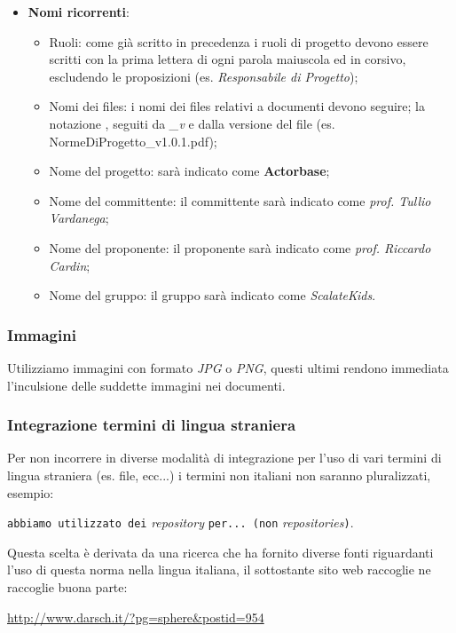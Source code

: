 \documentclass{scalatekids-article}
\begin{document}
\begin{itemize}
\item \textbf{Nomi ricorrenti}:
  \begin{itemize}
  \item Ruoli: come già scritto in precedenza i ruoli di progetto devono essere scritti con la prima lettera di ogni parola maiuscola ed in corsivo, escludendo le proposizioni (es. \textit{Responsabile di Progetto});
  \item Nomi dei files: i nomi dei files relativi a documenti devono seguire;
    la notazione \textit{}, seguiti da \textit{\_v} e dalla
    versione del file (es. NormeDiProgetto\_v1.0.1.pdf);
  \item Nome del progetto: sarà indicato come \textbf{Actorbase};
  \item Nome del committente: il committente sarà indicato come \textit{prof. Tullio Vardanega};
  \item Nome del proponente: il proponente sarà indicato come \textit{prof. Riccardo Cardin};
  \item Nome del gruppo: il gruppo sarà indicato come \textit{ScalateKids}.
  \end{itemize}
\end{itemize}

\subsubsection{Immagini}
Utilizziamo immagini con formato \textit{JPG} o \textit{PNG}, questi ultimi rendono immediata l'inculsione delle suddette immagini nei documenti.

\subsubsection{Integrazione termini di lingua straniera}
Per non incorrere in diverse modalità di integrazione per l'uso di vari termini di lingua straniera (es. file,  ecc...) i termini non italiani non saranno pluralizzati, esempio:\\
\begin{center}
  \verb=abbiamo utilizzato dei= \textit{repository} \verb=per... (non= \textit{repositories}\verb=)=.
\end{center}
Questa scelta è derivata da una ricerca che ha fornito diverse fonti riguardanti l'uso di questa norma nella lingua italiana, il sottostante sito web raccoglie ne raccoglie buona parte:\\
\begin{center}
  \url{http://www.darsch.it/?pg=sphere&postid=954}
\end{center}
\end{document}
